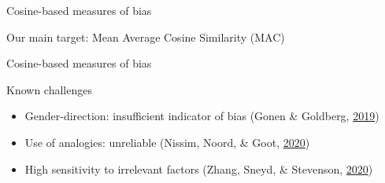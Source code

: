 \documentclass[10pt,ignorenonframetext,x11names, dvipsnames, bibspacing,natbib]{beamer}
\providecommand{\tightlist}{%
  \setlength{\itemsep}{0pt}\setlength{\parskip}{0pt}}
\begin{document}
\begin{frame}{Cosine-based measures of bias}
\protect\hypertarget{cosine-based-measures-of-bias-8}{}

\begin{block}{Our main target: Mean Average Cosine Similarity (MAC)}

\footnotesize 
\begin{table}

\caption{\label{tab:religionTableHeadEarly}A few rows from the religion dataset}
\centering
{}
\end{table}
\normalsize

\end{block}

\end{frame}

\begin{frame}{Cosine-based measures of bias}
\protect\hypertarget{cosine-based-measures-of-bias-9}{}

\begin{block}{Known challenges}

\begin{itemize}
\tightlist
\item
  Gender-direction: insufficient indicator of bias \footnotesize  (Gonen
  \& Goldberg, \protect\hyperlink{ref-Gonen2019lipstick}{2019})
\end{itemize}

\normalsize

\begin{itemize}
\item
  Use of analogies: unreliable \footnotesize  (Nissim, Noord, \& Goot,
  \protect\hyperlink{ref-Nissim2020fair}{2020}) \normalsize
\item
  High sensitivity to irrelevant factors \footnotesize  (Zhang, Sneyd,
  \& Stevenson, \protect\hyperlink{ref-zhang2020robustness}{2020})
  \normalsize
\end{itemize}

\end{block}

\end{frame}
\end{document}
